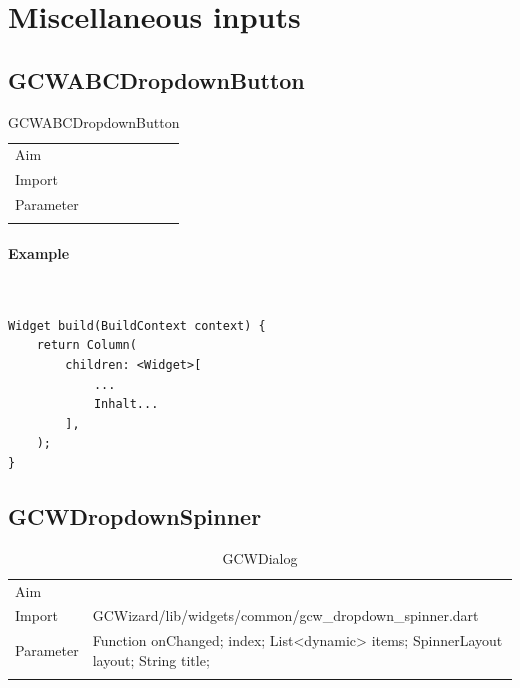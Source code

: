 \newpage
\section{Miscellaneous inputs}
\subsection{GCWABCDropdownButton}
\begin{table}[H]
\begin{tabular}[h]{p{2cm}p{9cm}}
    \caption{GCWABCDropdownButton}
    Aim       & \\
    Import    & \\
    Parameter & \\
    \label{tab:GCWABCDropdownButton}
\end{tabular}
\end{table}
\paragraph*{Example} \,
\begin{lstlisting}
Widget build(BuildContext context) {
    return Column(
        children: <Widget>[
            ...
            Inhalt...
        ],
    );
}
\end{lstlisting}
\label{fig: ExampleGCWABCDropdownButton}

\newpage
\subsection{GCWDropdownSpinner}
\label{fig: GCWDropdownSpinner}
\begin{table}[H]
\begin{tabular}[h]{p{2cm}p{9cm}}
    \caption{GCWDialog}
    Aim       & \\
    Import    & GCWizard/lib/widgets/common/gcw\_dropdown\_spinner.dart\\
    Parameter & Function onChanged;
                index;
                List<dynamic> items;
                SpinnerLayout layout;
                String title;\\
    \label{tab:GCWDropdownSpinner}
\end{tabular}
\end{table}
